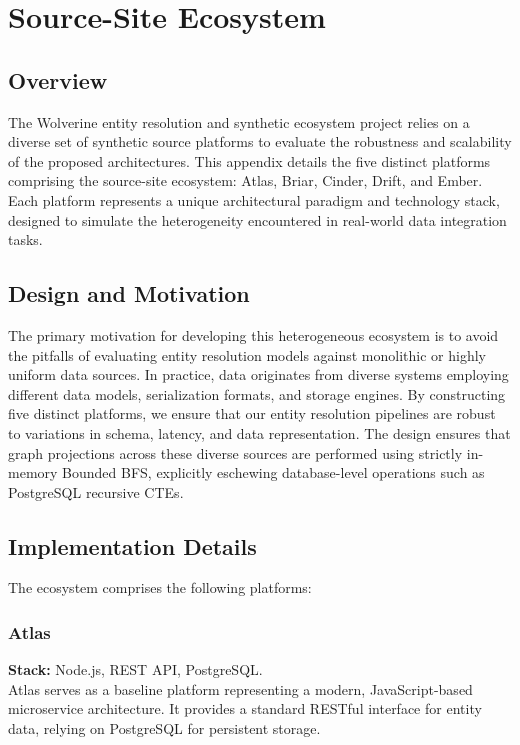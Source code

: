 \chapter{Source-Site Ecosystem}
\label{app:source-site-ecosystem}

\section{Overview}
The Wolverine entity resolution and synthetic ecosystem project relies on a diverse set of synthetic source platforms to evaluate the robustness and scalability of the proposed architectures. This appendix details the five distinct platforms comprising the source-site ecosystem: Atlas, Briar, Cinder, Drift, and Ember. Each platform represents a unique architectural paradigm and technology stack, designed to simulate the heterogeneity encountered in real-world data integration tasks. 

\section{Design and Motivation}
The primary motivation for developing this heterogeneous ecosystem is to avoid the pitfalls of evaluating entity resolution models against monolithic or highly uniform data sources. In practice, data originates from diverse systems employing different data models, serialization formats, and storage engines. By constructing five distinct platforms, we ensure that our entity resolution pipelines are robust to variations in schema, latency, and data representation. The design ensures that graph projections across these diverse sources are performed using strictly in-memory Bounded BFS, explicitly eschewing database-level operations such as PostgreSQL recursive CTEs.

\section{Implementation Details}
The ecosystem comprises the following platforms:

\subsection{Atlas}
\textbf{Stack:} Node.js, REST API, PostgreSQL. \\
Atlas serves as a baseline platform representing a modern, JavaScript-based microservice architecture. It provides a standard RESTful interface for entity data, relying on PostgreSQL for persistent storage.

